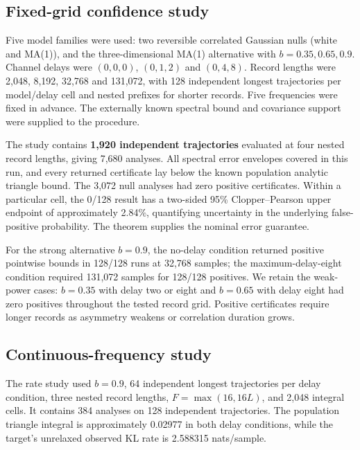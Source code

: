 \documentclass[11pt,a4paper]{article}
\begin{document}
\subsection{Fixed-grid confidence study}

Five model families were used: two reversible correlated Gaussian nulls (white and MA(1)), and the three-dimensional MA(1) alternative with \(b=0.35,0.65,0.9\). Channel delays were \((0,0,0)\), \((0,1,2)\) and \((0,4,8)\). Record lengths were 2,048, 8,192, 32,768 and 131,072, with 128 independent longest trajectories per model/delay cell and nested prefixes for shorter records. Five frequencies were fixed in advance. The externally known spectral bound and covariance support were supplied to the procedure.

The study contains \textbf{1,920 independent trajectories} evaluated at four nested record lengths, giving 7,680 analyses. All spectral error envelopes covered in this run, and every returned certificate lay below the known population analytic triangle bound. The 3,072 null analyses had zero positive certificates. Within a particular cell, the 0/128 result has a two-sided 95\% Clopper--Pearson upper endpoint of approximately 2.84\%, quantifying uncertainty in the underlying false-positive probability. The theorem supplies the nominal error guarantee.

For the strong alternative \(b=0.9\), the no-delay condition returned positive pointwise bounds in 128/128 runs at 32,768 samples; the maximum-delay-eight condition required 131,072 samples for 128/128 positives. We retain the weak-power cases: \(b=0.35\) with delay two or eight and \(b=0.65\) with delay eight had zero positives throughout the tested record grid. Positive certificates require longer records as asymmetry weakens or correlation duration grows.

\subsection{Continuous-frequency study}

The rate study used \(b=0.9\), 64 independent longest trajectories per delay condition, three nested record lengths, \(F=\max(16,16L)\), and 2,048 integral cells. It contains 384 analyses on 128 independent trajectories. The population triangle integral is approximately 0.02977 in both delay conditions, while the target's unrelaxed observed KL rate is 2.588315 nats/sample.
\end{document}
